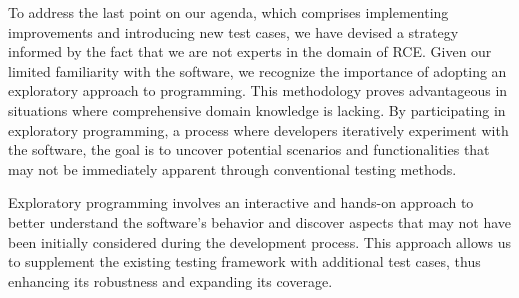 To address the last point on our agenda, which comprises implementing improvements and introducing new test cases, we have devised a strategy informed by the fact that we are not experts in the domain of \ac{RCE}. Given our limited familiarity with the software, we recognize the importance of adopting an exploratory approach to programming. This methodology proves advantageous in situations where comprehensive domain knowledge is lacking. By participating in exploratory programming, a process where developers iteratively experiment with the software, the goal is to uncover potential scenarios and functionalities that may not be immediately apparent through conventional testing methods. 

Exploratory programming involves an interactive and hands-on approach to better understand the software's behavior and discover aspects that may not have been initially considered during the development process. This approach allows us to supplement the existing testing framework with additional test cases, thus enhancing its robustness and expanding its coverage.